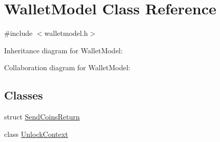 \hypertarget{class_wallet_model}{}\section{Wallet\+Model Class Reference}
\label{class_wallet_model}


{\ttfamily \#include $<$walletmodel.\+h$>$}



Inheritance diagram for Wallet\+Model\+:


Collaboration diagram for Wallet\+Model\+:
\subsection*{Classes}
\begin{DoxyCompactItemize}
\item 
struct \hyperlink{struct_wallet_model_1_1_send_coins_return}{Send\+Coins\+Return}
\item 
class \hyperlink{class_wallet_model_1_1_unlock_context}{Unlock\+Context}
\end{DoxyCompactItemize}
